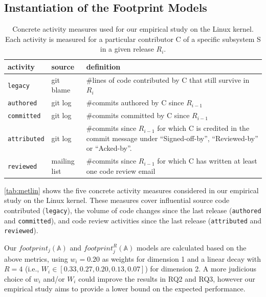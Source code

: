 \subsection{Instantiation of the Footprint Models}
\label{sec:inst-footpr-meas}

\begin{table}[t]
\begin{center}
\begin{tabular}{lll}
activity & source & definition\\
\hline
\texttt{legacy} & git blame & \#lines of code contributed by C that still survive in $R_i$\\
\texttt{authored} & git log & \#commits authored by C since $R_{i-1}$\\
\texttt{committed} & git log & \#commits committed by C since $R_{i-1}$\\
\texttt{attributed} & git log & \#commits since $R_{i-1}$ for which C is credited in the commit message under ``Signed-off-by'', ``Reviewed-by'' or ``Acked-by''.\\
\texttt{reviewed} & mailing list & \#commits since $R_{i-1}$ for which C has written at least one code review email\\
\end{tabular}
\end{center}
\caption{Concrete activity measures used for our empirical study on the Linux kernel. Each activity is measured for a particular contributor C of a specific subsystem S in a given release $R_i$.}
\label{tab:metlin}
\end{table}

\autoref{tab:metlin} shows the five concrete activity measures considered in our empirical study on the Linux kernel. These measures cover influential source code contributed (\texttt{legacy}), the volume of code changes since the last release (\texttt{authored} and \texttt{committed}), and code review activities since the last release (\texttt{attributed} and \texttt{reviewed}).

Our $footprint_j(\mathbb{A})$ and $footprint_j^R(\mathbb{A})$ models are calculated based on the above metrics, using $w_i=0.20$ as weights for dimension 1 and a linear decay with $R=4$ (i.e., $W_i \in [0.33,0.27,0.20,0.13,0.07]$) for dimension 2. A more judicious choice of $w_i$ and/or $W_i$ could improve the results in RQ2 and RQ3, however our empirical study aims to provide a lower bound on the expected performance.



